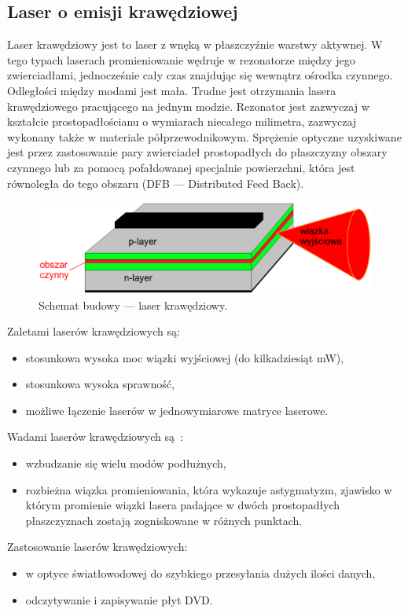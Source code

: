 \subsection{Laser o emisji krawędziowej}
Laser krawędziowy jest to laser z wnęką w płaszczyźnie warstwy aktywnej. W tego typach laserach promieniowanie wędruje w rezonatorze między
jego zwierciadłami, jednocześnie cały czas znajdując się wewnątrz ośrodka czynnego. Odległości między modami jest mała.
Trudne jest otrzymania lasera krawędziowego pracującego na jednym modzie.
Rezonator jest zazwyczaj w kształcie prostopadłościanu o wymiarach niecałego milimetra, zazwyczaj wykonany także w materiale półprzewodnikowym\cite{publikcja_nakwaski}.
Sprężenie optyczne uzyskiwane jest przez zastosowanie pary zwierciadeł prostopadłych do płaszczyzny obszary czynnego lub
za pomocą pofałdowanej specjalnie powierzchni, która jest równoległa do tego obszaru (DFB --- Distributed Feed Back).
\begin{figure}[H]
\center
\includegraphics[scale=0.25]{kraw2.eps}
\caption{Schemat budowy --- laser krawędziowy.}
\label{fig:teoria_rys_3}
\end{figure}
Zaletami laserów krawędziowych są:
\begin{itemize}
\item stosunkowa wysoka moc wiązki wyjściowej \cite{publikcja_nakwaski} (do kilkadziesiąt mW),
\item stosunkowa wysoka sprawność,
\item możliwe łączenie laserów w jednowymiarowe matryce laserowe.
\end{itemize}
Wadami laserów krawędziowych są~\cite{publikcja_nakwaski}:
\begin{itemize}
\item wzbudzanie się wielu modów podłużnych,
\item rozbieżna wiązka promieniowania, która wykazuje astygmatyzm, zjawisko w którym promienie wiązki lasera padające w dwóch prostopadłych
płaszczyznach zostają zogniskowane w różnych punktach.
\end{itemize}
Zastosowanie laserów krawędziowych:
\begin{itemize}
\item w optyce światłowodowej do szybkiego przesyłania dużych ilości danych,
\item odczytywanie i zapisywanie płyt DVD.
\end{itemize}
\newpage
